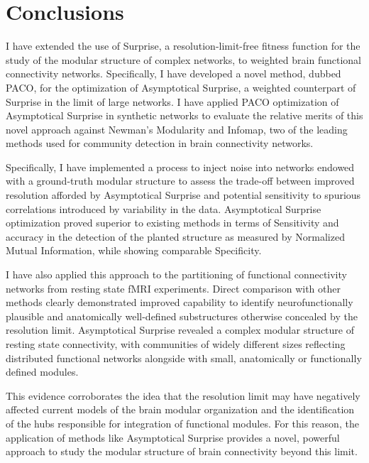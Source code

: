 \section{Conclusions}
I have extended the use of Surprise, a resolution-limit-free fitness function for the study of the modular structure of complex networks, to weighted brain functional connectivity networks.
Specifically, I have developed a novel method, dubbed PACO, for the optimization of Asymptotical Surprise, a weighted counterpart of Surprise in the limit of large networks.
I have applied PACO optimization of Asymptotical Surprise in synthetic networks to evaluate the relative merits of this novel approach against Newman's Modularity and Infomap, two of the leading methods used for community detection in brain connectivity networks.

Specifically, I have implemented a process to inject noise into networks endowed with a ground-truth modular structure to assess the trade-off between improved resolution afforded by Asymptotical Surprise and potential sensitivity to spurious correlations introduced by variability in the data.
Asymptotical Surprise optimization proved superior to existing methods in terms of Sensitivity and accuracy in the detection of the planted structure as measured by Normalized Mutual Information, while showing comparable Specificity.

I have also applied this approach to the partitioning of functional connectivity networks from resting state fMRI experiments.
Direct comparison with other methods clearly demonstrated improved capability to identify neurofunctionally plausible and anatomically well-defined substructures otherwise concealed by the resolution limit.
Asymptotical Surprise revealed a complex modular structure of resting state connectivity, with communities of widely different sizes reflecting distributed functional networks alongside with small, anatomically or functionally defined modules.

This evidence corroborates the idea that the resolution limit may have negatively affected current models of the brain modular organization and the identification of the hubs responsible for integration of functional modules.
For this reason, the application of methods like Asymptotical Surprise provides a novel, powerful approach to study the modular structure of brain connectivity beyond this limit.
